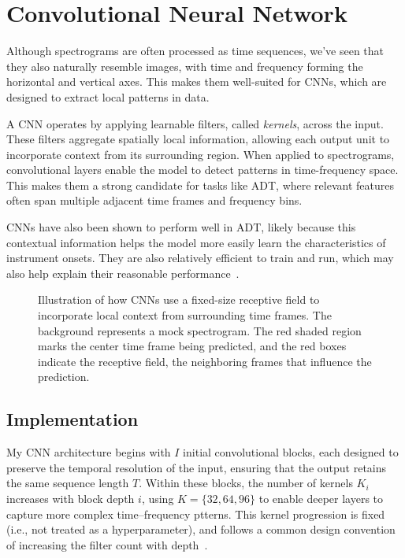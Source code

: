 \section{Convolutional Neural Network}

Although spectrograms are often processed as time sequences, we've seen that they also naturally resemble images, with time and frequency forming the horizontal and vertical axes. This makes them well-suited for \glspl{CNN}, which are designed to extract local patterns in data.

A \gls{CNN} operates by applying learnable filters, called \textit{kernels}, across the input. These filters aggregate spatially local information, allowing each output unit to incorporate context from its surrounding region. When applied to spectrograms, convolutional layers enable the model to detect patterns in time-frequency space. This makes them a strong candidate for tasks like \gls{ADT}, where relevant features often span multiple adjacent time frames and frequency bins.

\glspl{CNN} have also been shown to perform well in \gls{ADT}, likely because this contextual information helps the model more easily learn the characteristics of instrument onsets. They are also relatively efficient to train and run, which may also help explain their reasonable performance~\cite{Vogl2017DrumTV}.

\begin{figure}[H]
    \centering
    
    \caption{Illustration of how \glspl{CNN} use a fixed-size receptive field to incorporate local context from surrounding time frames. The background represents a mock spectrogram. The red shaded region marks the center time frame being predicted, and the red boxes indicate the receptive field, the neighboring frames that influence the prediction.}
    \label{CNNInfluenceFigure}
\end{figure}

\subsection{Implementation}

My \gls{CNN} architecture begins with $I$ initial convolutional blocks, each designed to preserve the temporal resolution of the input, ensuring that the output retains the same sequence length $T$. Within these blocks, the number of kernels $K_i$ increases with block depth $i$, using $K = \{32, 64, 96\}$ to enable deeper layers to capture more complex time–frequency ptterns. This kernel progression is fixed (i.e., not treated as a hyperparameter), and follows a common design convention of increasing the filter count with depth~\cite{simonyan2014very}.

